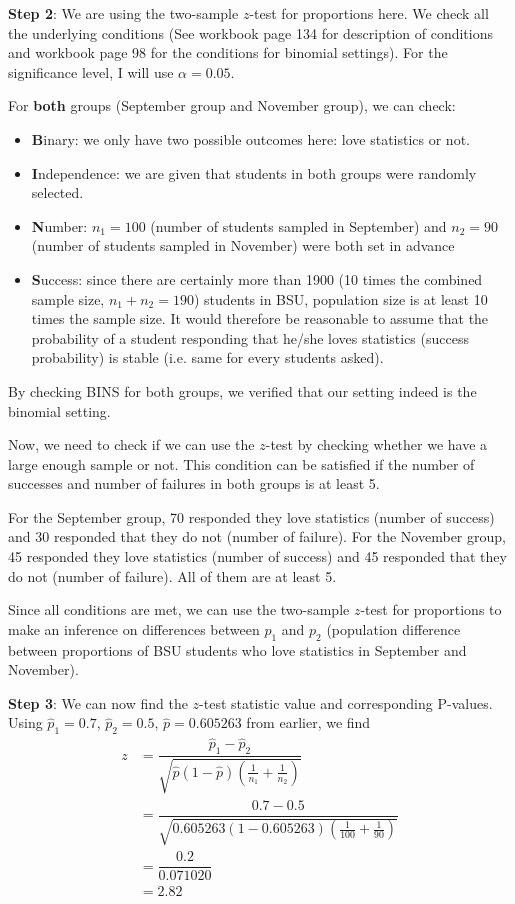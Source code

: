 \documentclass[12pt]{article}
\begin{document}
\noindent \textbf{Step 2}: We are using the two-sample $z$-test for proportions here. We check all the underlying conditions (See workbook page 134 for description of conditions and workbook page 98 for the conditions for binomial settings). For the significance level, I will use $\alpha = 0.05$.

For \textbf{both} groups (September group and November group), we can check:
\begin{itemize}
	\item \textbf{B}inary: we only have two possible outcomes here: love statistics or not.
	\item \textbf{I}ndependence: we are given that students in both groups were randomly selected.
	\item \textbf{N}umber: $n_1 = 100$ (number of students sampled in September) and $n_2 = 90$ (number of students sampled in November) were both set in advance
	\item \textbf{S}uccess: since there are certainly more than 1900 (10 times the combined sample size, $n_1+n_2 = 190$) students in BSU, population size is at least 10 times the sample size. It would therefore be reasonable to assume that the probability of a student responding that he/she loves statistics (success probability) is stable (i.e. same for every students asked).
\end{itemize}
By checking BINS for both groups, we verified that our setting indeed is the binomial setting. 

Now, we need to check if we can use the $z$-test by checking whether we have a large enough sample or not. This condition can be satisfied if the number of successes and number of failures in both groups is at least 5.

For the September group, 70 responded they love statistics (number of success) and 30 responded that they do not (number of failure). For the November group, 45 responded they love statistics (number of success) and 45 responded that they do not (number of failure). All of them are at least 5. 

Since all conditions are met, we can use the two-sample $z$-test for proportions to make an inference on differences between $p_1$ and $p_2$ (population difference between proportions of BSU students who love statistics in September and November).

\noindent \textbf{Step 3}: We can now find the $z$-test statistic value and corresponding P-values. Using $\hat{p}_1 = 0.7$, $\hat{p}_2 = 0.5$, $\hat{p} = 0.605263$ from earlier, we find
\begin{align*}
z &= \dfrac{\hat{p}_1 - \hat{p}_2}{\sqrt{ \hat{p} (1-\hat{p}) \left( \frac{1}{n_1} + \frac{1}{n_2} \right) }} \\
&= \dfrac{0.7 - 0.5}{\sqrt{ 0.605263 (1-0.605263) \left( \frac{1}{100} + \frac{1}{90} \right) }} \\
&= \dfrac{0.2}{0.071020} \\
&= 2.82
\end{align*}
\end{document}
